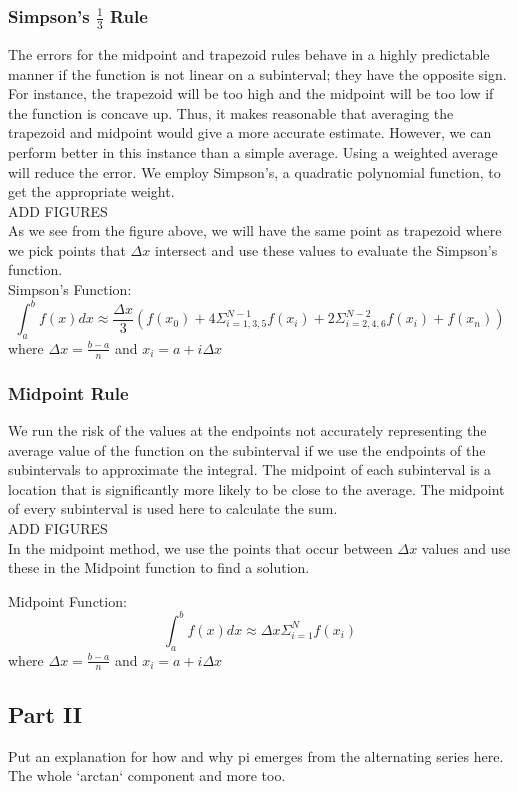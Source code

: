 \documentclass[11pt]{article}
\begin{document}
\subsubsection*{Simpson's $\frac{1}{3}$ Rule}
The errors for the midpoint and trapezoid rules behave in a highly predictable manner if the function is not linear on a subinterval; they have the opposite sign. For instance, the trapezoid will be too high and the midpoint will be too low if the function is concave up. Thus, it makes reasonable that averaging the trapezoid and midpoint would give a more accurate estimate. However, we can perform better in this instance than a simple average. Using a weighted average will reduce the error. We employ Simpson's, a quadratic polynomial function, to get the appropriate weight.\\

ADD FIGURES\\

As we see from the figure above, we will have the same point as trapezoid where we pick points that $\Delta x$ intersect and use these values to evaluate the Simpson’s function.\\

Simpson's Function:
\[
	\int_a^b f(x)dx \approx \frac{\Delta x}{3} \left(f(x_0) + 4\Sigma_{i=1,3,5}^{N-1}f(x_i)+2\Sigma_{i=2,4,6}^{N-2}f(x_i)+f(x_n)\right)
\]
where $\Delta x = \frac{b - a}{n}$ and $x_i = a + i\Delta x$

\subsubsection*{Midpoint Rule}
We run the risk of the values at the endpoints not accurately representing the average value of the function on the subinterval if we use the endpoints of the subintervals to approximate the integral. The midpoint of each subinterval is a location that is significantly more likely to be close to the average.  The midpoint of every subinterval is used here to calculate the sum.\\

ADD FIGURES\\

In the midpoint method, we use the points that occur between $\Delta x$ values and use these in the Midpoint function to find a solution.

Midpoint Function:
\[
	\int_a^b f(x)dx \approx \Delta x \Sigma_{i=1}^Nf(x_i)
\]
where $\Delta x = \frac{b - a}{n}$ and $x_i = a + i\Delta x$

\subsection{Part II}\label{S:3.2}
Put an explanation for how and why pi emerges from the alternating series here. The whole `arctan` component and more too.
\end{document}
